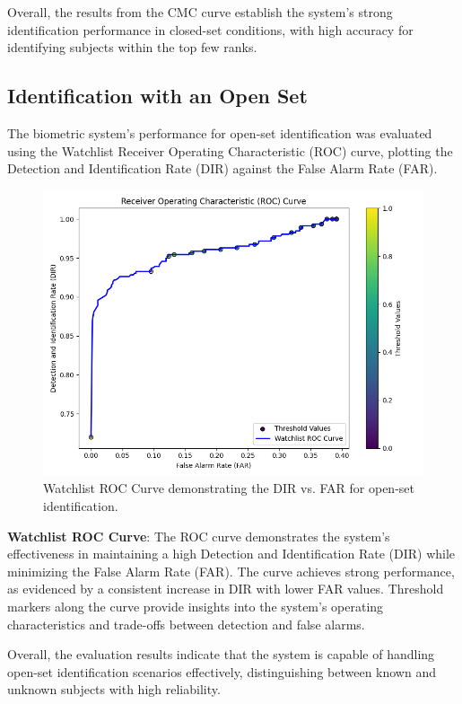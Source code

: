 Overall, the results from the CMC curve establish the system's strong identification performance in closed-set conditions, with high accuracy for identifying subjects within the top few ranks.

\subsection{Identification with an Open Set}

The biometric system's performance for open-set identification was evaluated using the Watchlist Receiver Operating Characteristic (ROC) curve, plotting the Detection and Identification Rate (DIR) against the False Alarm Rate (FAR).

\begin{figure}[!ht]
    \centering
    \includegraphics[width=\columnwidth]{./images/plots/id-open/watchlist_roc_curve.png}
    \caption{Watchlist ROC Curve demonstrating the DIR vs. FAR for open-set identification.}
    \label{fig:watchlist_roc_curve}
\end{figure}

\textbf{Watchlist ROC Curve}: The ROC curve demonstrates the system's effectiveness in maintaining a high Detection and Identification Rate (DIR) while minimizing the False Alarm Rate (FAR). The curve achieves strong performance, as evidenced by a consistent increase in DIR with lower FAR values. Threshold markers along the curve provide insights into the system's operating characteristics and trade-offs between detection and false alarms. 

Overall, the evaluation results indicate that the system is capable of handling open-set identification scenarios effectively, distinguishing between known and unknown subjects with high reliability.

